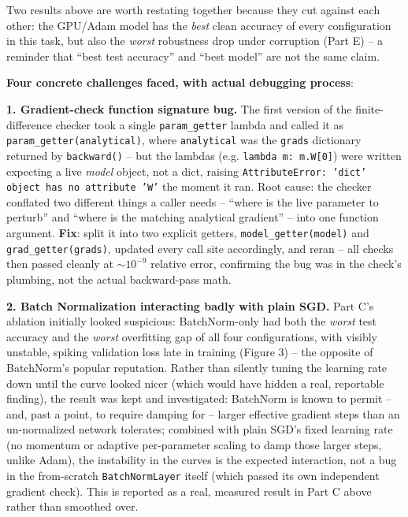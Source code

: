 \documentclass[11pt,a4paper]{article}
\begin{document}
Two results above are worth restating together because they cut against each other: the GPU/Adam
model has the \emph{best} clean accuracy of every configuration in this task, but also the
\emph{worst} robustness drop under corruption (Part E) -- a reminder that ``best test accuracy''
and ``best model'' are not the same claim.

\textbf{Four concrete challenges faced, with actual debugging process}:

\textbf{1. Gradient-check function signature bug.} The first version of the finite-difference
checker took a single \texttt{param\_getter} lambda and called it as
\texttt{param\_getter(analytical)}, where \texttt{analytical} was the \texttt{grads} dictionary
returned by \texttt{backward()} -- but the lambdas (e.g. \texttt{lambda m: m.W[0]}) were written
expecting a live \emph{model} object, not a dict, raising
\texttt{AttributeError: 'dict' object has no attribute 'W'} the moment it ran. Root cause: the
checker conflated two different things a caller needs -- ``where is the live parameter to
perturb'' and ``where is the matching analytical gradient'' -- into one function argument.
\textbf{Fix}: split it into two explicit getters, \texttt{model\_getter(model)} and
\texttt{grad\_getter(grads)}, updated every call site accordingly, and reran -- all checks then
passed cleanly at $\sim10^{-9}$ relative error, confirming the bug was in the check's plumbing,
not the actual backward-pass math.

\textbf{2. Batch Normalization interacting badly with plain SGD.} Part C's ablation initially
looked suspicious: BatchNorm-only had both the \emph{worst} test accuracy and the \emph{worst}
overfitting gap of all four configurations, with visibly unstable, spiking validation loss late
in training (Figure 3) -- the opposite of BatchNorm's popular reputation. Rather than silently
tuning the learning rate down until the curve looked nicer (which would have hidden a real,
reportable finding), the result was kept and investigated: BatchNorm is known to permit --
and, past a point, to require damping for -- larger effective gradient steps than an
un-normalized network tolerates; combined with plain SGD's fixed learning rate (no momentum or
adaptive per-parameter scaling to damp those larger steps, unlike Adam), the instability in the
curves is the expected interaction, not a bug in the from-scratch \texttt{BatchNormLayer} itself
(which passed its own independent gradient check). This is reported as a real, measured result in
Part C above rather than smoothed over.
\end{document}
